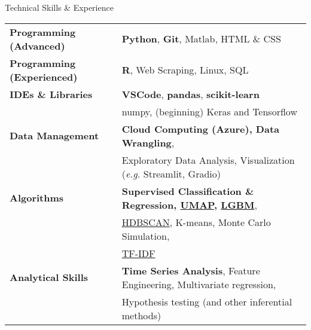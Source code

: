 \documentclass{resume} %
\begin{document}

\begin{rSection}{Technical Skills \& Experience}

\begin{small}

\begin{tabular}{ @{} >{\bfseries}l @{\hspace{6ex}} l }
Programming (Advanced)    & \textbf{Python}, \textbf{Git}, Matlab, HTML \& CSS \\ 
Programming (Experienced) & \textbf{R}, Web Scraping, Linux, SQL \\
IDEs \& Libraries         & \textbf{VSCode}, \textbf{pandas}, \textbf{scikit-learn} \\ & numpy, (beginning) Keras and Tensorflow \\
Data Management           & \textbf{Cloud Computing (Azure), Data Wrangling}, \\ & Exploratory Data Analysis, Visualization (\emph{e.g.} Streamlit, Gradio) \\
Algorithms                & \textbf{Supervised Classification \& Regression, \href{https://proceedings.neurips.cc/paper/2017/file/6449f44a102fde848669bdd9eb6b76fa-Paper.pdf}{UMAP}, \href{https://lightgbm.readthedocs.io/en/latest/}{LGBM}}, \\ & \href{https://arxiv.org/pdf/1705.07321.pdf}{HDBSCAN}, K-means, Monte Carlo Simulation, \\ & \href{https://scikit-learn.org/stable/modules/generated/sklearn.feature_extraction.text.TfidfVectorizer.html}{TF-IDF} \\
Analytical Skills         & \textbf{Time Series Analysis}, Feature Engineering, Multivariate regression, \\ & Hypothesis testing (and other inferential methods) \\
\end{tabular}

\end{small}

\end{rSection}

\end{document}
